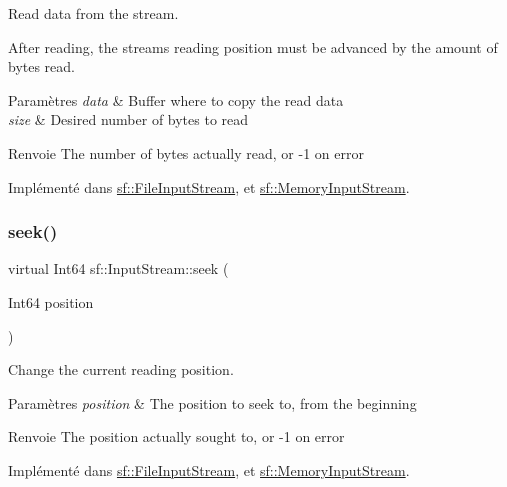 Read data from the stream. 

After reading, the stream\textquotesingle{}s reading position must be advanced by the amount of bytes read.


\begin{DoxyParams}{Paramètres}
{\em data} & Buffer where to copy the read data \\
\hline
{\em size} & Desired number of bytes to read\\
\hline
\end{DoxyParams}
\begin{DoxyReturn}{Renvoie}
The number of bytes actually read, or -\/1 on error 
\end{DoxyReturn}


Implémenté dans \hyperlink{classsf_1_1FileInputStream_ad1e94c4152429f485db224c44ee1eb50}{sf\+::\+File\+Input\+Stream}, et \hyperlink{classsf_1_1MemoryInputStream_adff5270c521819639154d42d76fd4c34}{sf\+::\+Memory\+Input\+Stream}.

\mbox{\label{classsf_1_1InputStream_a76aba8e5d5cf9b1c5902d5e04f7864fc}} 
\subsubsection{\texorpdfstring{seek()}{seek()}}
{\footnotesize\ttfamily virtual Int64 sf\+::\+Input\+Stream\+::seek (\begin{DoxyParamCaption}\item[{Int64}]{position }\end{DoxyParamCaption})\hspace{0.3cm}{\ttfamily [pure virtual]}}



Change the current reading position. 


\begin{DoxyParams}{Paramètres}
{\em position} & The position to seek to, from the beginning\\
\hline
\end{DoxyParams}
\begin{DoxyReturn}{Renvoie}
The position actually sought to, or -\/1 on error 
\end{DoxyReturn}


Implémenté dans \hyperlink{classsf_1_1FileInputStream_abdaf5700d4e1de07568e7829106b4eb9}{sf\+::\+File\+Input\+Stream}, et \hyperlink{classsf_1_1MemoryInputStream_aa2ac8fda2bdb4c95248ae90c71633034}{sf\+::\+Memory\+Input\+Stream}.

